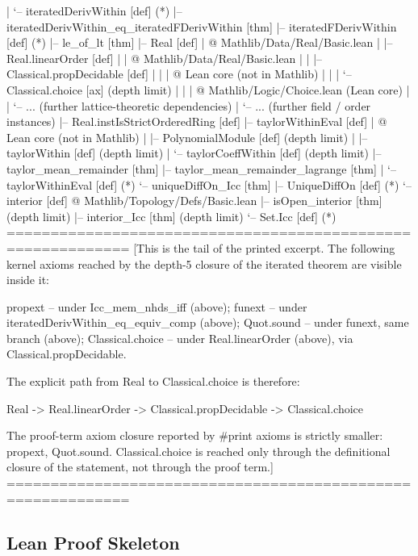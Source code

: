\documentclass[11pt,reqno]{amsart}
\begin{document}
\begin{verbatimbox}
|   `-- iteratedDerivWithin  [def]   (*)
|-- iteratedDerivWithin_eq_iteratedFDerivWithin  [thm]
|-- iteratedFDerivWithin  [def]   (*)
|-- le_of_lt  [thm]
|-- Real  [def]
|   @ Mathlib/Data/Real/Basic.lean
|   |-- Real.linearOrder  [def]
|   |   @ Mathlib/Data/Real/Basic.lean
|   |   |-- Classical.propDecidable  [def]
|   |   |   @ Lean core (not in Mathlib)
|   |   |   `-- Classical.choice  [ax]   (depth limit)
|   |   |   @ Mathlib/Logic/Choice.lean (Lean core)
|   |   `-- ... (further lattice-theoretic dependencies)
|   `-- ... (further field / order instances)
|-- Real.instIsStrictOrderedRing  [def]
|-- taylorWithinEval  [def]
|   @ Lean core (not in Mathlib)
|   |-- PolynomialModule  [def]   (depth limit)
|   |-- taylorWithin  [def]   (depth limit)
|   `-- taylorCoeffWithin  [def]   (depth limit)
|-- taylor_mean_remainder  [thm]
|-- taylor_mean_remainder_lagrange  [thm]
|   `-- taylorWithinEval  [def]   (*)
`-- uniqueDiffOn_Icc  [thm]
    |-- UniqueDiffOn  [def]   (*)
    `-- interior  [def]
        @ Mathlib/Topology/Defs/Basic.lean
        |-- isOpen_interior  [thm]   (depth limit)
        |-- interior_Icc  [thm]   (depth limit)
        `-- Set.Icc  [def]   (*)
============================================================
[This is the tail of the printed excerpt.  The following kernel
axioms reached by the depth-5 closure of the iterated theorem are
visible inside it:

  propext             -- under Icc_mem_nhds_iff (above);
  funext              -- under iteratedDerivWithin_eq_equiv_comp (above);
  Quot.sound          -- under funext, same branch (above);
  Classical.choice    -- under Real.linearOrder (above), via
                         Classical.propDecidable.

The explicit path from Real to Classical.choice is therefore:

    Real -> Real.linearOrder -> Classical.propDecidable
         -> Classical.choice

The proof-term axiom closure reported by #print axioms is strictly
smaller: {propext, Quot.sound}.  Classical.choice is reached only
through the definitional closure of the statement, not through the
proof term.]
============================================================
\end{verbatimbox}
\text{ \ } \text{ \ }

\subsection{Lean Proof Skeleton}
\end{document}

